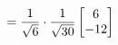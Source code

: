 \documentclass[preview]{standalone}
\begin{document}
\begin{align*}
\special{dvisvgm:raw <g id='unique000'>}= \frac{1}{\sqrt{6}} \cdot \frac{1}{\sqrt{30}} \begin{bmatrix} 6 \\ -12 \end{bmatrix}\special{dvisvgm:raw </g>}
\end{align*}
\end{document}

